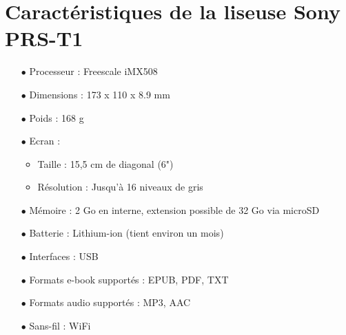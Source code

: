 \section{Caractéristiques de la liseuse Sony PRS-T1}

\begin{itemize}
		\item[$\bullet$] Processeur : Freescale iMX508
		\item[$\bullet$] Dimensions : 173 x 110 x 8.9 mm
		\item[$\bullet$] Poids : 168 g
		\item[$\bullet$] Ecran :
			\begin{itemize}
				\item Taille : 15,5 cm de diagonal (6")
				\item Résolution : Jusqu'à 16 niveaux de gris
			\end{itemize}
		\item[$\bullet$] Mémoire : 2 Go en interne, extension possible de 32 Go via microSD
		\item[$\bullet$] Batterie : Lithium-ion (tient environ un mois)
		\item[$\bullet$] Interfaces : USB
		\item[$\bullet$] Formats e-book supportés : EPUB, PDF, TXT
		\item[$\bullet$] Formats audio supportés : MP3, AAC
		\item[$\bullet$] Sans-fil : WiFi
		
\end{itemize}

